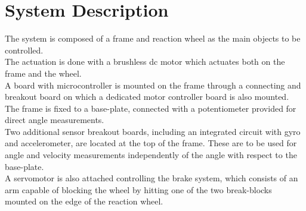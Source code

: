 \chapter{System Description}\label{systemDescription}
The system is composed of a frame and reaction wheel as the main objects to be controlled.\\ The actuation is done with a brushless dc motor which actuates both on the frame and the wheel.\\ A board with microcontroller is mounted on the frame through a connecting and breakout board on which a dedicated motor controller board is also mounted.\\ The frame is fixed to a base-plate, connected with a potentiometer provided for direct angle measurements.\\ Two additional sensor breakout boards, including an integrated circuit with gyro and accelerometer, are located at the top of the frame. These are to be used for angle and velocity measurements independently of the angle with respect to the base-plate.\\ A servomotor is also attached controlling the brake system, which consists of an arm capable of blocking the wheel by hitting one of the two break-blocks mounted on the edge of the reaction wheel.

